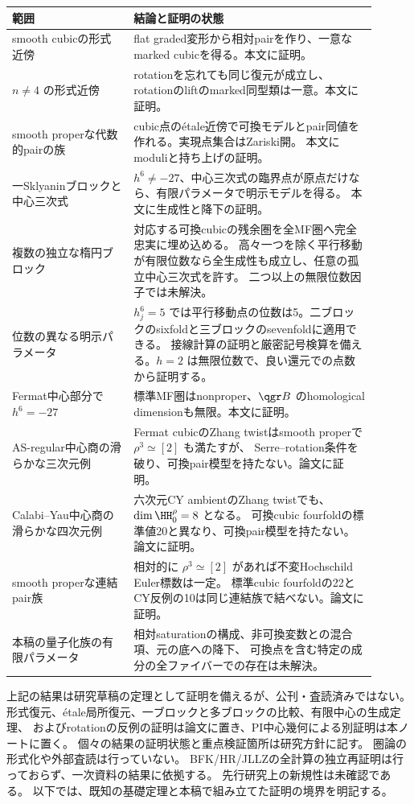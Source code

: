 \begin{longtable}{p{0.30\linewidth}p{0.60\linewidth}}
\toprule
範囲 & 結論と証明の状態\\
\midrule
\endhead
smooth cubicの形式近傍 &
flat graded変形から相対pairを作り、一意なmarked cubicを得る。本文に証明。\\
\(n\ne4\) の形式近傍 &
rotationを忘れても同じ復元が成立し、rotationのliftのmarked同型類は一意。本文に証明。\\
smooth properな代数的pairの族 &
cubic点のétale近傍で可換モデルとpair同値を作れる。実現点集合はZariski開。
本文にmoduliと持ち上げの証明。\\
一Sklyaninブロックと中心三次式 &
\(h^6\ne-27\)、中心三次式の臨界点が原点だけなら、有限パラメータで明示モデルを得る。
本文に生成性と降下の証明。\\
複数の独立な楕円ブロック &
対応する可換cubicの残余圏を全MF圏へ完全忠実に埋め込める。
高々一つを除く平行移動が有限位数なら全生成性も成立し、任意の孤立中心三次式を許す。
二つ以上の無限位数因子では未解決。\\
位数の異なる明示パラメータ &
\(h_j^6=5\) では平行移動点の位数は5。二ブロックのsixfoldと三ブロックのsevenfoldに適用できる。
接線計算の証明と厳密記号検算を備える。\(h=2\) は無限位数で、良い還元での点数から証明する。\\
Fermat中心部分で \(h^6=-27\) &
標準MF圏はnonproper、\(\qgr B\) のhomological dimensionも無限。本文に証明。\\
AS-regular中心商の滑らかな三次元例 &
Fermat cubicのZhang twistはsmooth properで \(\rho^3\simeq[2]\) も満たすが、
Serre--rotation条件を破り、可換pair模型を持たない。論文に証明。\\
Calabi--Yau中心商の滑らかな四次元例 &
六次元CY ambientのZhang twistでも、\(\dim\HH_0^{\rho}=8\) となる。
可換cubic fourfoldの標準値20と異なり、可換pair模型を持たない。論文に証明。\\
smooth properな連結pair族 &
相対的に \(\rho^3\simeq[2]\) があれば不変Hochschild Euler標数は一定。
標準cubic fourfoldの22とCY反例の10は同じ連結族で結べない。論文に証明。\\
本稿の量子化族の有限パラメータ &
相対saturationの構成、非可換変数との混合項、元の底への降下、
可換点を含む特定の成分の全ファイバーでの存在は未解決。\\
\bottomrule
\end{longtable}

上記の結果は研究草稿の定理として証明を備えるが、公刊・査読済みではない。
形式復元、étale局所復元、一ブロックと多ブロックの比較、有限中心の生成定理、
およびrotationの反例の証明は論文に置き、PI中心幾何による別証明は本ノートに置く。
個々の結果の証明状態と重点検証箇所は研究方針に記す。
圏論の形式化や外部査読は行っていない。
BFK/HR/JLLZの全計算の独立再証明は行っておらず、一次資料の結果に依拠する。
先行研究上の新規性は未確認である。
以下では、既知の基礎定理と本稿で組み立てた証明の境界を明記する。

